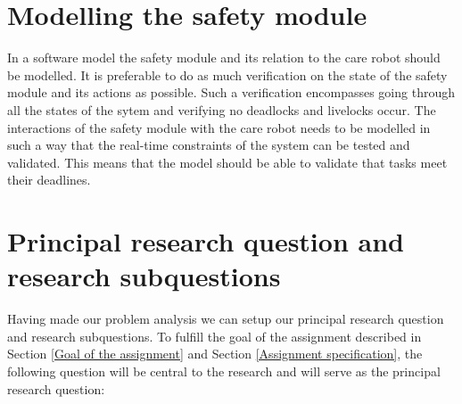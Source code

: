 \documentclass[12pt]{scrreprt}
\begin{document}

\section{Modelling the safety module}
\label{Modelling the safety module}
In a software model the safety module and its relation to the care robot should be modelled. It is preferable to do as much verification on the state of the safety module and its actions as possible. Such a verification encompasses going through all the states of the sytem and verifying no deadlocks and livelocks occur.
The interactions of the safety module with the care robot needs to be modelled in such a way that the real-time constraints of the system can be tested and validated. This means that the model should be able to validate that tasks meet their deadlines.
\par



\section{Principal research question and research subquestions}
\label{Principal research question and research subquestions}
Having made our problem analysis we can setup our principal research question and research subquestions. To fulfill the goal of the assignment described in Section \ref{Goal of the assignment} and Section \ref{Assignment specification}, the following question will be central to the research and will serve as the principal research question:
\end{document}
